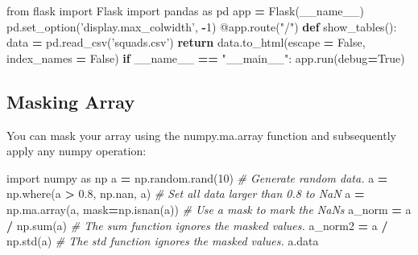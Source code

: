 \documentclass[]{book}
\newenvironment{Shaded}{\begin{snugshade}}{\end{snugshade}}
\newcommand{\KeywordTok}[1]{\textcolor[rgb]{0.13,0.29,0.53}{\textbf{#1}}}
\newcommand{\DecValTok}[1]{\textcolor[rgb]{0.00,0.00,0.81}{#1}}
\newcommand{\FloatTok}[1]{\textcolor[rgb]{0.00,0.00,0.81}{#1}}
\newcommand{\StringTok}[1]{\textcolor[rgb]{0.31,0.60,0.02}{#1}}
\newcommand{\ImportTok}[1]{#1}
\newcommand{\CommentTok}[1]{\textcolor[rgb]{0.56,0.35,0.01}{\textit{#1}}}
\newcommand{\VariableTok}[1]{\textcolor[rgb]{0.00,0.00,0.00}{#1}}
\newcommand{\ControlFlowTok}[1]{\textcolor[rgb]{0.13,0.29,0.53}{\textbf{#1}}}
\newcommand{\OperatorTok}[1]{\textcolor[rgb]{0.81,0.36,0.00}{\textbf{#1}}}
\newcommand{\BuiltInTok}[1]{#1}
\newcommand{\AttributeTok}[1]{\textcolor[rgb]{0.77,0.63,0.00}{#1}}
\newcommand{\NormalTok}[1]{#1}
\theoremstyle{definition}
\theoremstyle{definition}
\theoremstyle{definition}
\theoremstyle{remark}
\begin{document}
\begin{Shaded}
\begin{Highlighting}[]
\ImportTok{from}\NormalTok{ flask }\ImportTok{import}\NormalTok{ Flask}
\ImportTok{import}\NormalTok{ pandas }\ImportTok{as}\NormalTok{ pd}
\NormalTok{app }\OperatorTok{=}\NormalTok{ Flask(}\VariableTok{__name__}\NormalTok{)}
\NormalTok{pd.set_option(}\StringTok{'display.max_colwidth'}\NormalTok{, }\OperatorTok{-}\DecValTok{1}\NormalTok{)}
\AttributeTok{@app.route}\NormalTok{(}\StringTok{"/"}\NormalTok{)}
\KeywordTok{def}\NormalTok{ show_tables():}
\NormalTok{    data }\OperatorTok{=}\NormalTok{ pd.read_csv(}\StringTok{'squads.csv'}\NormalTok{)}
    \ControlFlowTok{return}\NormalTok{ data.to_html(escape }\OperatorTok{=} \VariableTok{False}\NormalTok{, index_names }\OperatorTok{=} \VariableTok{False}\NormalTok{)}
\ControlFlowTok{if} \VariableTok{__name__} \OperatorTok{==} \StringTok{"__main__"}\NormalTok{:}
\NormalTok{    app.run(debug}\OperatorTok{=}\VariableTok{True}\NormalTok{)}
\end{Highlighting}
\end{Shaded}

\subsection{Masking Array}\label{masking-array}

You can mask your array using the numpy.ma.array function and
subsequently apply any numpy operation:

\begin{Shaded}
\begin{Highlighting}[]
\ImportTok{import}\NormalTok{ numpy }\ImportTok{as}\NormalTok{ np}
\NormalTok{a }\OperatorTok{=}\NormalTok{ np.random.rand(}\DecValTok{10}\NormalTok{)            }\CommentTok{# Generate random data.}
\NormalTok{a }\OperatorTok{=}\NormalTok{ np.where(a }\OperatorTok{>} \FloatTok{0.8}\NormalTok{, np.nan, a)  }\CommentTok{# Set all data larger than 0.8 to NaN}
\NormalTok{a }\OperatorTok{=}\NormalTok{ np.ma.array(a, mask}\OperatorTok{=}\NormalTok{np.isnan(a)) }\CommentTok{# Use a mask to mark the NaNs}
\NormalTok{a_norm  }\OperatorTok{=}\NormalTok{ a }\OperatorTok{/}\NormalTok{ np.}\BuiltInTok{sum}\NormalTok{(a) }\CommentTok{# The sum function ignores the masked values.}
\NormalTok{a_norm2 }\OperatorTok{=}\NormalTok{ a }\OperatorTok{/}\NormalTok{ np.std(a) }\CommentTok{# The std function ignores the masked values.}
\NormalTok{a.data}
\end{Highlighting}
\end{Shaded}
\end{document}

